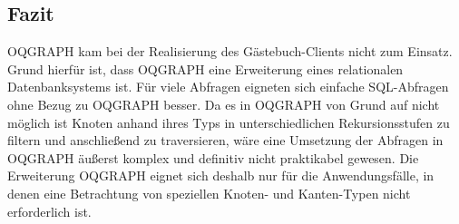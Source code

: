 \subsection{Fazit}

OQGRAPH kam bei der Realisierung des Gästebuch-Clients nicht zum Einsatz. Grund hierfür ist, dass OQGRAPH eine Erweiterung eines relationalen Datenbanksystems ist. Für viele Abfragen eigneten sich einfache SQL-Abfragen ohne Bezug zu OQGRAPH besser. Da es in OQGRAPH von Grund auf nicht möglich ist Knoten anhand ihres Typs in unterschiedlichen Rekursionsstufen zu filtern und anschließend zu traversieren, wäre eine Umsetzung der Abfragen in OQGRAPH äußerst komplex und definitiv nicht praktikabel gewesen. Die Erweiterung OQGRAPH eignet sich deshalb nur für die Anwendungsfälle, in denen eine Betrachtung von speziellen Knoten- und Kanten-Typen nicht erforderlich ist.
